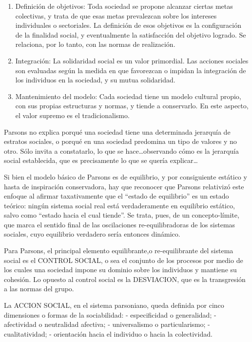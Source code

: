 \documentclass[
]{book}
\begin{document}
\begin{enumerate}
\def\labelenumi{\arabic{enumi})}
\setcounter{enumi}{1}
\item
  Definición de objetivos: Toda sociedad se propone alcanzar ciertas metas colectivas, y trata de que esas metas prevalezcan sobre los intereses individuales o sectoriales. La definición de esos objetivos es la configuración de la finalidad social, y eventualmente la satisfacción del objetivo logrado. Se relaciona, por lo tanto, con las normas de realización.
\item
  Integración: La solidaridad social es un valor primordial. Las acciones sociales son evaluadas según la medida en que favorezcan o impidan la integración de los individuos en la sociedad, y su mutua solidaridad.
\item
  Mantenimiento del modelo: Cada sociedad tiene un modelo cultural propio, con sus propias estructuras y normas, y tiende a conservarlo. En este aspecto, el valor supremo es el tradicionalismo.
\end{enumerate}

Parsons no explica porqué una sociedad tiene una determinada jerarquía de estratos sociales, o porqué en una sociedad predomina un tipo de valores y no otro. Sólo invita a constatarlo, lo que se hace\ldots observando cómo es la jerarquía social establecida, que es precisamente lo que se quería explicar\ldots{}

Si bien el modelo básico de Parsons es de equilibrio, y por consiguiente estático y hasta de inspiración conservadora, hay que reconocer que Parsons relativizó este enfoque al afirmar taxativamente que el ``estado de equilibrio'' es un estado teórico: ningún sistema social real está verdaderamente en equilibrio estático, salvo como ``estado hacia el cual tiende''. Se trata, pues, de un concepto-límite, que marca el sentido final de las oscilaciones re-equilibradoras de los sistemas sociales, cuyo equilibrio verdadero sería entonces dinámico.

Para Parsons, el principal elemento equilibrante,o re-equilibrante del sistema social es el CONTROL SOCIAL, o sea el conjunto de los procesos por medio de los cuales una sociedad impone su dominio sobre los individuos y mantiene su cohesión. Lo opuesto al control social es la DESVIACION, que es la transgresión a las normas del grupo.

La ACCION SOCIAL, en el sistema parsoniano, queda definida por cinco dimensiones o formas de la sociabilidad: - especificidad o generalidad; - afectividad o neutralidad afectiva; - universalismo o particularismo; - cualitatividad; - orientación hacia el individuo o hacia la colectividad.
\end{document}
